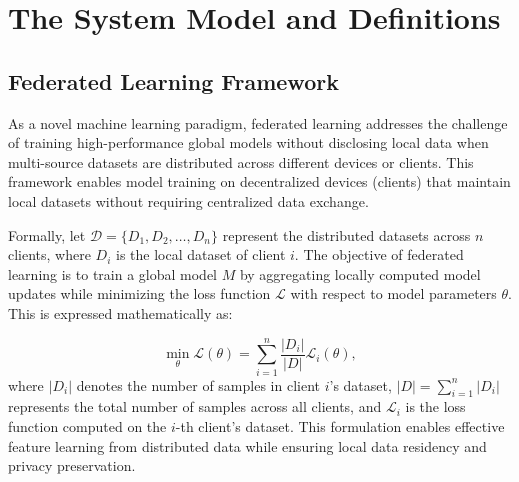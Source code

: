 \documentclass[journal,twoside,web]{ieeecolor}
\begin{document}






\section{The System Model and Definitions}
\subsection{Federated Learning Framework}

As a novel machine learning paradigm, federated learning addresses the challenge of training high-performance global models without disclosing local data when multi-source datasets are distributed across different devices or clients. This framework enables model training on decentralized devices (clients) that maintain local datasets without requiring centralized data exchange.

Formally, let $\mathcal{D} = \{D_1, D_2, \ldots, D_n\}$ represent the distributed datasets across $n$ clients, where $D_i$ is the local dataset of client $i$. The objective of federated learning is to train a global model $M$ by aggregating locally computed model updates while minimizing the loss function $\mathcal{L}$ with respect to model parameters $\theta$. This is expressed mathematically as:

\begin{equation}
\min_{\theta} \mathcal{L}(\theta) = \sum_{i=1}^{n} \frac{|D_i|}{|D|} \mathcal{L}_i (\theta),
\label{eq:fl_objective}
\end{equation}
where $|D_i|$ denotes the number of samples in client $i$'s dataset, $|D| = \sum_{i=1}^n |D_i|$ represents the total number of samples across all clients, and $\mathcal{L}_i$ is the loss function computed on the $i$-th client's dataset. This formulation enables effective feature learning from distributed data while ensuring local data residency and privacy preservation.
\end{document}
